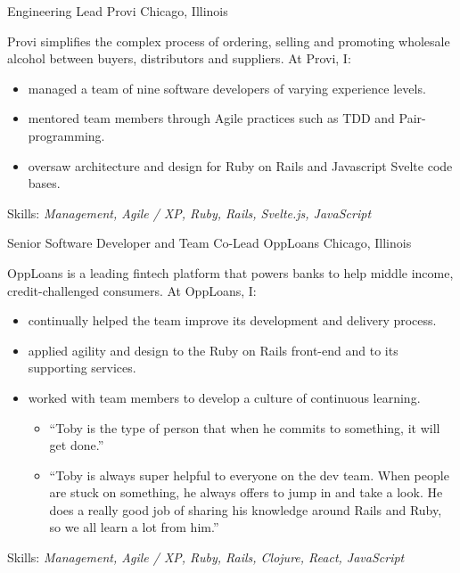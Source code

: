 \documentclass[11pt,letterpaper]{moderncv}
\begin{document}
 {Engineering Lead} {Provi} {Chicago,
  Illinois} {} { %
  Provi simplifies the complex process of ordering, selling and promoting
  wholesale alcohol between buyers, distributors and suppliers.  At Provi, I:
  \begin{itemize}
  \item managed a team of nine software developers of varying experience
    levels.
  \item mentored team members through Agile practices such as TDD and
    Pair-programming.
  \item oversaw architecture and design for Ruby on Rails and Javascript
    Svelte code bases.
  \end{itemize}
  Skills: \emph{Management, Agile / XP, Ruby, Rails, Svelte.js, JavaScript}
}

 {Senior Software Developer and Team Co-Lead}
  {OppLoans} {Chicago, Illinois} {} { %
  OppLoans is a leading fintech platform that powers banks to help middle
  income, credit-challenged consumers.  At OppLoans, I:
  \begin{itemize}
  \item continually helped the team improve its development and delivery
    process.
  \item applied agility and design to the Ruby on Rails front-end and to its
    supporting services.
  \item worked with team members to develop a culture of continuous learning.
    \begin{itemize}
    \item ``Toby is the type of person that when he commits to something, it
      will get done.''
    \item ``Toby is always super helpful to everyone on the dev team.  When
      people are stuck on something, he always offers to jump in and take a
      look.  He does a really good job of sharing his knowledge around Rails
      and Ruby, so we all learn a lot from him.''
    \end{itemize}
  \end{itemize}
  Skills: \emph{Management, Agile / XP, Ruby, Rails, Clojure, React, JavaScript}
}
\end{document}
